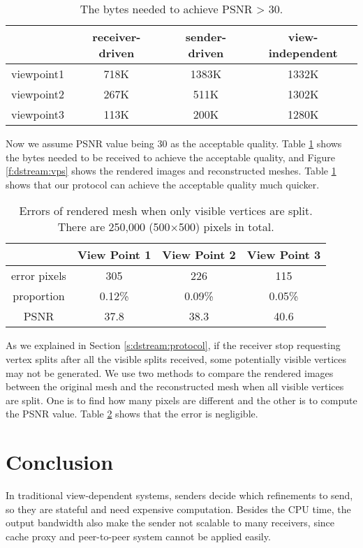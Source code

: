 \begin{table}
\centering
\begin{tabular}{|c|c|c|c|}
\hline
       & receiver-driven & sender-driven & view-independent\\
\hline
viewpoint1 &    718K     &   1383K      &     1332K       \\
\hline
viewpoint2 &    267K     &    511K      &     1302K       \\
\hline
viewpoint3 &    113K     &    200K      &     1280K       \\
\hline
\end{tabular}
\caption{The bytes needed to achieve PSNR > 30.\label{t:dstream:psnr30}}
\end{table}
Now we assume PSNR value being 30 as the acceptable quality. Table \ref{t:dstream:psnr30} shows
the bytes needed to be received to achieve the acceptable quality, and Figure \ref{f:dstream:vps}
shows the rendered images and reconstructed meshes.
Table \ref{t:dstream:psnr30} shows that our protocol can achieve the acceptable quality much quicker. 
\fi
\begin{table}
\centering
\begin{tabular}{|c|c|c|c|}
\hline
             & View Point 1 & View Point 2 & View Point 3 \\
\hline
error pixels &   305           &      226       &     115         \\
\hline
proportion   & 0.12\%             &   0.09\%           &  0.05\%           \\
\hline
PSNR         &   37.8        &    38.3        &    40.6        \\
\hline
\end{tabular}
\caption{Errors of rendered mesh when only visible vertices are split.
There are 250,000 (500$\times$500) pixels in total.\label{t:dstream:error}}
\end{table}
As we explained in Section \ref{s:dstream:protocol}, if the receiver stop requesting vertex splits after all the visible splits received,
some potentially visible vertices may not be generated.
We use two methods to compare the rendered images between the original mesh and the reconstructed mesh when all visible vertices
are split. One is to find
how many pixels are different and the other is to compute the PSNR value. 
Table \ref{t:dstream:error} shows that the error is negligible.
\section{Conclusion}
\label{s:dstream:conclude}
In traditional view-dependent systems,
senders decide which refinements to send, so they are
stateful and need expensive computation. %
Besides the CPU time,
the output bandwidth also make the sender not scalable to many receivers,
since cache proxy and peer-to-peer system cannot be applied easily.

